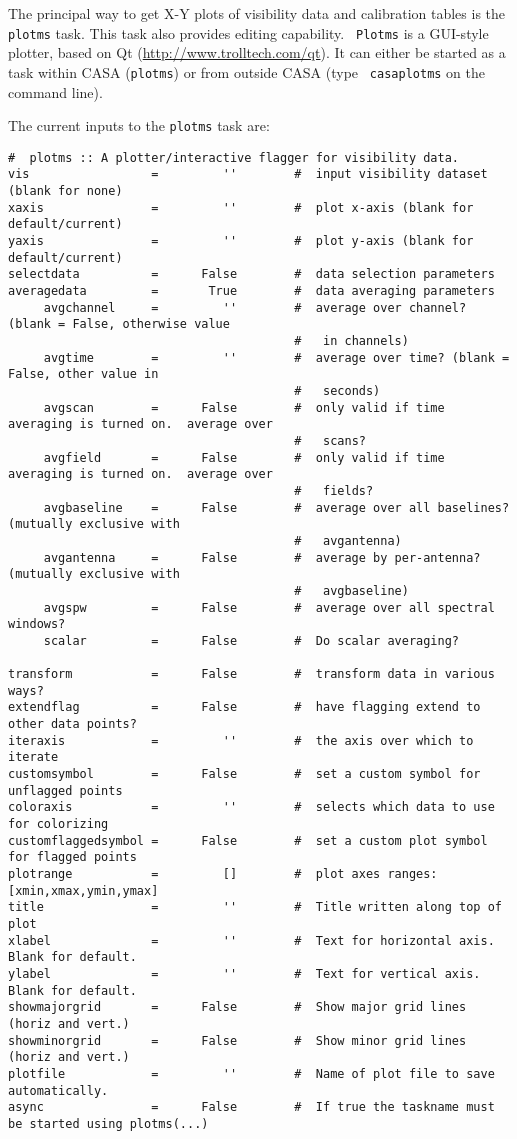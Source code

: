 The principal way to get X-Y plots of visibility data and calibration
tables is the {\tt
  plotms} task. This task also provides editing capability. {\tt
  Plotms} is a GUI-style plotter, based on Qt
(\url{http://www.trolltech.com/qt}). It can either be started as a
task within CASA ({\tt plotms}) or from outside CASA (type {\tt
  casaplotms} on the command line).

The current inputs to the {\tt plotms} task are:
\small
\begin{verbatim}
#  plotms :: A plotter/interactive flagger for visibility data.
vis                 =         ''        #  input visibility dataset (blank for none)
xaxis               =         ''        #  plot x-axis (blank for default/current)
yaxis               =         ''        #  plot y-axis (blank for default/current)
selectdata          =      False        #  data selection parameters
averagedata         =       True        #  data averaging parameters
     avgchannel     =         ''        #  average over channel?  (blank = False, otherwise value
                                        #   in channels)
     avgtime        =         ''        #  average over time? (blank = False, other value in
                                        #   seconds)
     avgscan        =      False        #  only valid if time averaging is turned on.  average over
                                        #   scans?
     avgfield       =      False        #  only valid if time averaging is turned on.  average over
                                        #   fields?
     avgbaseline    =      False        #  average over all baselines?  (mutually exclusive with
                                        #   avgantenna)
     avgantenna     =      False        #  average by per-antenna?  (mutually exclusive with
                                        #   avgbaseline)
     avgspw         =      False        #  average over all spectral windows?
     scalar         =      False        #  Do scalar averaging?

transform           =      False        #  transform data in various ways?
extendflag          =      False        #  have flagging extend to other data points?
iteraxis            =         ''        #  the axis over which to iterate
customsymbol        =      False        #  set a custom symbol for unflagged points
coloraxis           =         ''        #  selects which data to use for colorizing
customflaggedsymbol =      False        #  set a custom plot symbol for flagged points
plotrange           =         []        #  plot axes ranges: [xmin,xmax,ymin,ymax]
title               =         ''        #  Title written along top of plot
xlabel              =         ''        #  Text for horizontal axis. Blank for default.
ylabel              =         ''        #  Text for vertical axis. Blank for default.
showmajorgrid       =      False        #  Show major grid lines (horiz and vert.)
showminorgrid       =      False        #  Show minor grid lines (horiz and vert.)
plotfile            =         ''        #  Name of plot file to save automatically.
async               =      False        #  If true the taskname must be started using plotms(...)

\end{verbatim}
